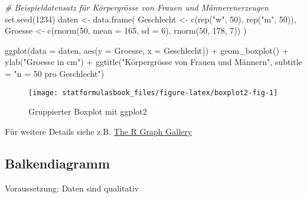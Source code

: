 \documentclass[
]{book}
\newenvironment{Shaded}{\begin{snugshade}}{\end{snugshade}}
\newcommand{\AttributeTok}[1]{\textcolor[rgb]{0.77,0.63,0.00}{#1}}
\newcommand{\CommentTok}[1]{\textcolor[rgb]{0.56,0.35,0.01}{\textit{#1}}}
\newcommand{\DecValTok}[1]{\textcolor[rgb]{0.00,0.00,0.81}{#1}}
\newcommand{\FunctionTok}[1]{\textcolor[rgb]{0.00,0.00,0.00}{#1}}
\newcommand{\NormalTok}[1]{#1}
\newcommand{\OtherTok}[1]{\textcolor[rgb]{0.56,0.35,0.01}{#1}}
\newcommand{\SpecialCharTok}[1]{\textcolor[rgb]{0.00,0.00,0.00}{#1}}
\newcommand{\StringTok}[1]{\textcolor[rgb]{0.31,0.60,0.02}{#1}}
\begin{document}
\begin{Shaded}
\begin{Highlighting}[]
\CommentTok{\# Beispieldatensatz für Körpergrösse von Frauen und Männerenerzeugen}
\FunctionTok{set.seed}\NormalTok{(}\DecValTok{1234}\NormalTok{)}
\NormalTok{daten }\OtherTok{\textless{}{-}} \FunctionTok{data.frame}\NormalTok{(}
\NormalTok{  Geschlecht }\OtherTok{\textless{}{-}} \FunctionTok{c}\NormalTok{(}\FunctionTok{rep}\NormalTok{(}\StringTok{"w"}\NormalTok{, }\DecValTok{50}\NormalTok{), }\FunctionTok{rep}\NormalTok{(}\StringTok{"m"}\NormalTok{, }\DecValTok{50}\NormalTok{)),}
\NormalTok{  Groesse }\OtherTok{\textless{}{-}} \FunctionTok{c}\NormalTok{(}\FunctionTok{rnorm}\NormalTok{(}\DecValTok{50}\NormalTok{, }\AttributeTok{mean =} \DecValTok{165}\NormalTok{, }\AttributeTok{sd =} \DecValTok{6}\NormalTok{), }\FunctionTok{rnorm}\NormalTok{(}\DecValTok{50}\NormalTok{, }\DecValTok{178}\NormalTok{, }\DecValTok{7}\NormalTok{))}
\NormalTok{)}

\FunctionTok{ggplot}\NormalTok{(}\AttributeTok{data =}\NormalTok{ daten, }\FunctionTok{aes}\NormalTok{(}\AttributeTok{y =}\NormalTok{ Groesse, }\AttributeTok{x =}\NormalTok{ Geschlecht)) }\SpecialCharTok{+}
  \FunctionTok{geom\_boxplot}\NormalTok{() }\SpecialCharTok{+}
  \FunctionTok{ylab}\NormalTok{(}\StringTok{"Groesse in cm"}\NormalTok{) }\SpecialCharTok{+}
  \FunctionTok{ggtitle}\NormalTok{(}\StringTok{"Körpergrösse von Frauen und Männern"}\NormalTok{, }\AttributeTok{subtitle =} \StringTok{"n = 50 pro Geschlecht"}\NormalTok{)}
\end{Highlighting}
\end{Shaded}

\begin{figure}

{\centering \texttt{[image: statformulasbook\_files/figure-latex/boxplot2-fig-1]} 

}

\caption{Gruppierter Boxplot mit ggplot2}\label{fig:boxplot2-fig}
\end{figure}

Für weitere Details siehe z.B. \href{https://www.r-graph-gallery.com/262-basic-boxplot-with-ggplot2.html}{The R Graph Gallery}

\hypertarget{balkendiagramm}{%
\subsection{Balkendiagramm}\label{balkendiagramm}}

Voraussetzung: Daten sind qualitativ
\end{document}
